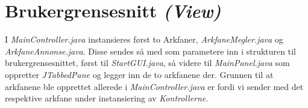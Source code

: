 \section{Brukergrensesnitt \emph{(View)}} \label{sec:brukergrensesnitt}
I \emph{MainController.java} instansieres først to Arkfaner, \emph{ArkfaneMegler.java} og \emph{ArkfaneAnnonse.java}.
Disse sendes så med som parametere inn i strukturen til brukergrensesnittet, først til \emph{StartGUI.java}, så videre til \emph{MainPanel.java} som oppretter \emph{JTabbedPane} og legger inn de to arkfanene der.
Grunnen til at arkfanene ble opprettet allerede i \emph{MainController.java} er fordi vi sender med det respektive arkfane under instansiering av \emph{Kontrollerne}.

